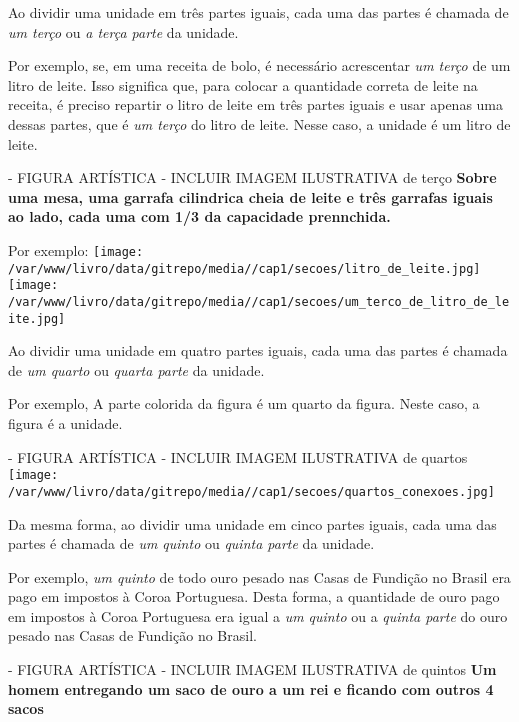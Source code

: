 \documentclass[a4,12pt]{book}
\begin{document}
Ao dividir uma unidade em três partes iguais, cada uma das partes é chamada de {\it um terço} ou {\it a terça parte} da unidade. 

Por exemplo, se, em uma receita de bolo, é necessário acrescentar {\it um terço} de um litro de leite. Isso significa que, para colocar a quantidade correta de leite na receita, é preciso repartir o litro de leite em três partes iguais e usar apenas uma dessas partes, que é {\it um terço} do litro de leite. Nesse caso, a unidade é um litro de leite.

\begin{imagem*}[breakable]{}{}   - FIGURA ARTÍSTICA - INCLUIR IMAGEM ILUSTRATIVA de terço   
  {\bf Sobre uma mesa, uma garrafa cilindrica cheia de leite e três garrafas iguais ao lado, cada uma com 1/3 da capacidade prennchida.}  
  
  Por exemplo:   
    \texttt{[image: /var/www/livro/data/gitrepo/media//cap1/secoes/litro\_de\_leite.jpg]}  
    \texttt{[image: /var/www/livro/data/gitrepo/media//cap1/secoes/um\_terco\_de\_litro\_de\_leite.jpg]}  
  
\end{imagem*}

Ao dividir uma unidade em quatro partes iguais, cada uma das partes é chamada de {\it um quarto} ou {\it quarta parte} da unidade. 

Por exemplo,
A parte colorida da figura é um quarto da figura. Neste caso, a figura é a unidade.

\begin{imagem*}[breakable]{}{}   - FIGURA ARTÍSTICA - INCLUIR IMAGEM ILUSTRATIVA de quartos  
    \texttt{[image: /var/www/livro/data/gitrepo/media//cap1/secoes/quartos\_conexoes.jpg]}  
   \end{imagem*}

Da mesma forma, ao dividir uma unidade em cinco partes iguais, cada uma das partes é chamada de {\it um quinto} ou {\it quinta parte} da unidade.

Por exemplo,
{\it um quinto} de todo ouro pesado nas Casas de Fundição no Brasil era pago em impostos à Coroa Portuguesa. Desta forma, a quantidade de ouro pago em impostos à Coroa Portuguesa era igual a {\it um quinto} ou a {\it quinta parte} do ouro pesado nas Casas de Fundição no Brasil.

\begin{imagem*}[breakable]{}{}   - FIGURA ARTÍSTICA - INCLUIR IMAGEM ILUSTRATIVA de quintos   
  {\bf Um homem entregando um saco de ouro a um rei e ficando com outros 4 sacos}  
\end{imagem*}
\end{document}
